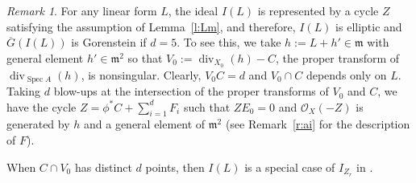 \documentclass[12pt]{amsart}
\theoremstyle{definition}
\theoremstyle{remark}
\newtheorem{rem}[thm]{Remark}
\numberwithin{equation}{section}
\newcommand{\lemref}[1]{Lemma~\ref{#1}}
\newcommand{\remref}[1]{Remark~\ref{#1}}
\DeclareMathOperator{\spec}{Spec}
\DeclareMathOperator{\di}{div}
\newcommand{\m}{\mathfrak m}
\newcommand{\cO}{\mathcal O}
\renewcommand{\:}{\colon}
\newcommand{\ol}[1]{\overline {#1}}
\begin{document}
\begin{rem} 
For any linear form $L$, the ideal $I(L)$ is represented by a cycle $Z$ satisfying the assumption of \lemref{l:Lm}, and therefore, $I(L)$ is elliptic and $\ol G(I(L))$ is Gorenstein if $d=5$.
To see this, we take $h:=L+h'\in \m$ with general element $h'\in \m^2$ so that $V_0:=\di_{X_0}(h)-C$, the proper transform of $\di_{\spec A}(h)$, is nonsingular.
Clearly, $V_0 C=d$ and $V_0 \cap C$ depends only on $L$. Taking $d$ blow-ups at the intersection of the proper transforms of $V_0$ and $C$, we have the cycle $Z=\phi^*C+\sum _{i=1}^d F_i$ such that $Z E_0=0$ and $\cO_X(-Z)$ is generated by $h$ and a general element of $\m^2$ (see \remref{r:ai} for the description of $F$).
\par 
When $C\cap V_0$ has distinct $d$ points, then $I(L)$ is a special case of $I_{Z_r}$ in \cite[4.5]{OWY5}.
\end{rem}
\end{document}
